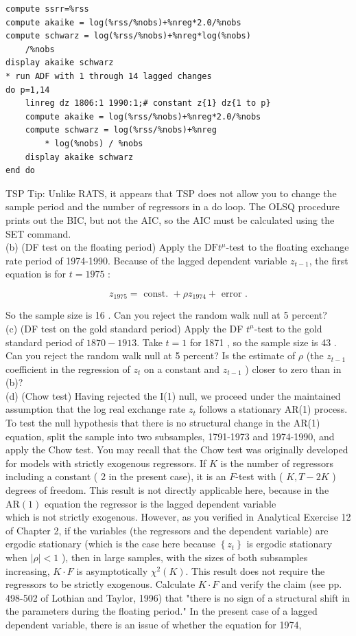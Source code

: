 \documentclass[10pt]{article}
\begin{document}
\begin{verbatim}
compute ssrr=%rss
compute akaike = log(%rss/%nobs)+%nreg*2.0/%nobs
compute schwarz = log(%rss/%nobs)+%nreg*log(%nobs)
    /%nobs
display akaike schwarz
* run ADF with 1 through 14 lagged changes
do p=1,14
    linreg dz 1806:1 1990:1;# constant z{1} dz{1 to p}
    compute akaike = log(%rss/%nobs)+%nreg*2.0/%nobs
    compute schwarz = log(%rss/%nobs)+%nreg
        * log(%nobs) / %nobs
    display akaike schwarz
end do
\end{verbatim}

TSP Tip: Unlike RATS, it appears that TSP does not allow you to change the sample period and the number of regressors in a do loop. The OLSQ procedure prints out the BIC, but not the AIC, so the AIC must be calculated using the SET command.\\
(b) (DF test on the floating period) Apply the $\mathrm{DF} t^{\mu}$-test to the floating exchange rate period of 1974-1990. Because of the lagged dependent variable $z_{t-1}$, the first equation is for $t=1975$ :

$$
z_{1975}=\text { const. }+\rho z_{1974}+\text { error } .
$$

So the sample size is 16 . Can you reject the random walk null at 5 percent?\\
(c) (DF test on the gold standard period) Apply the DF $t^{\mu}$-test to the gold standard period of $1870-1913$. Take $t=1$ for 1871 , so the sample size is 43 . Can you reject the random walk null at 5 percent? Is the estimate of $\rho$ (the $z_{t-1}$ coefficient in the regression of $z_{t}$ on a constant and $z_{t-1}$ ) closer to zero than in (b)?\\
(d) (Chow test) Having rejected the I(1) null, we proceed under the maintained assumption that the log real exchange rate $z_{t}$ follows a stationary AR(1) process. To test the null hypothesis that there is no structural change in the AR(1) equation, split the sample into two subsamples, 1791-1973 and 1974-1990, and apply the Chow test. You may recall that the Chow test was originally developed for models with strictly exogenous regressors. If $K$ is the number of regressors including a constant ( 2 in the present case), it is an $F$-test with ( $K, T-2 K$ ) degrees of freedom. This result is not directly applicable here, because in the $\mathrm{AR}(1)$ equation the regressor is the lagged dependent variable\\
which is not strictly exogenous. However, as you verified in Analytical Exercise 12 of Chapter 2, if the variables (the regressors and the dependent variable) are ergodic stationary (which is the case here because $\left\{z_{t}\right\}$ is ergodic stationary when $|\rho|<1$ ), then in large samples, with the sizes of both subsamples increasing, $K \cdot F$ is asymptotically $\chi^{2}(K)$. This result does not require the regressors to be strictly exogenous. Calculate $K \cdot F$ and verify the claim (see pp. 498-502 of Lothian and Taylor, 1996) that "there is no sign of a structural shift in the parameters during the floating period." In the present case of a lagged dependent variable, there is an issue of whether the equation for 1974,
\end{document}
